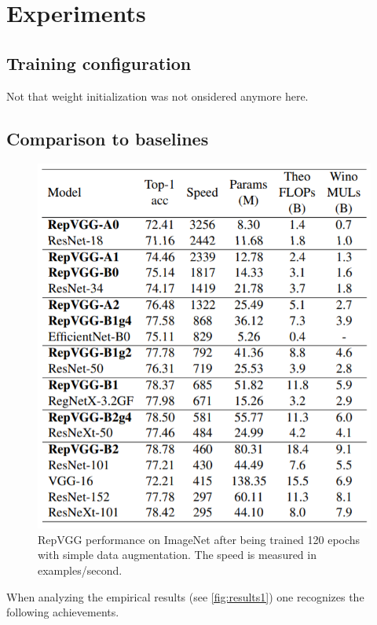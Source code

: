 \section{Experiments} \label{experiments}

\subsection{Training configuration}

Not that weight initialization was not onsidered anymore here. 

\subsection{Comparison to baselines}

\begin{figure}[t]
	\begin{center}
		\includegraphics[width=0.8\linewidth]{images/results1.PNG}
	\end{center}
	\caption{RepVGG performance on ImageNet \cite{JiaDeng.2009} after being trained 120 epochs with simple data augmentation. The speed is measured in examples/second.}
	\label{fig:results1}
\end{figure}

When analyzing the empirical results (see \autoref{fig:results1}) one recognizes the following achievements. 

